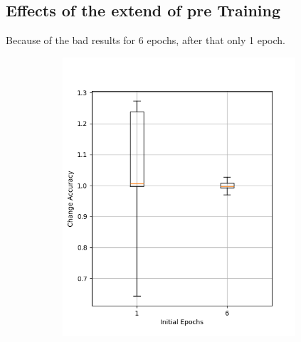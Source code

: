\subsection{Effects of the extend of pre Training}\label{subsec:effects-of-the-extend-of-pre-training}
Because of the bad results for 6 epochs, after that only 1 epoch.
\begin{figure}
    \begin{subfigure}{0.5\textwidth}
        \centering
        \includegraphics[width=0.95\textwidth]{plots/InitEpoch_NotTrained_accuracy.png}
    \end{subfigure}
    \begin{subfigure}{0.5\textwidth}
        \centering

\end{subfigure}
\end{figure}
